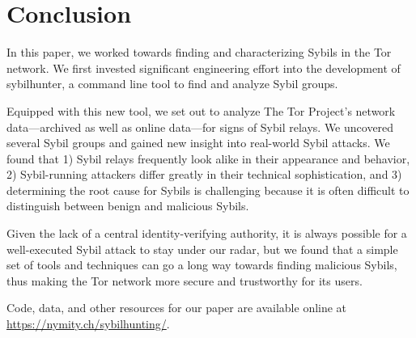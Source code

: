 \section{Conclusion}
\label{sec:conclusion}
In this paper, we worked towards finding and characterizing Sybils in the Tor
network.  We first invested significant engineering effort into the development
of sybilhunter, a command line tool to find and analyze Sybil groups.

Equipped with this new tool, we set out to analyze The Tor Project's network
data---archived as well as online data---for signs of Sybil relays.  We
uncovered several Sybil groups and gained new insight into real-world Sybil
attacks.  We found that 1) Sybil relays frequently look alike in their
appearance and behavior, 2) Sybil-running attackers differ greatly in their
technical sophistication, and 3) determining the root cause for Sybils is
challenging because it is often difficult to distinguish between benign and
malicious Sybils.

Given the lack of a central identity-verifying authority, it is always possible
for a well-executed Sybil attack to stay under our radar, but we found that a
simple set of tools and techniques can go a long way towards finding malicious
Sybils, thus making the Tor network more secure and trustworthy for its users.

Code, data, and other resources for our paper are available online at
\url{https://nymity.ch/sybilhunting/}.
